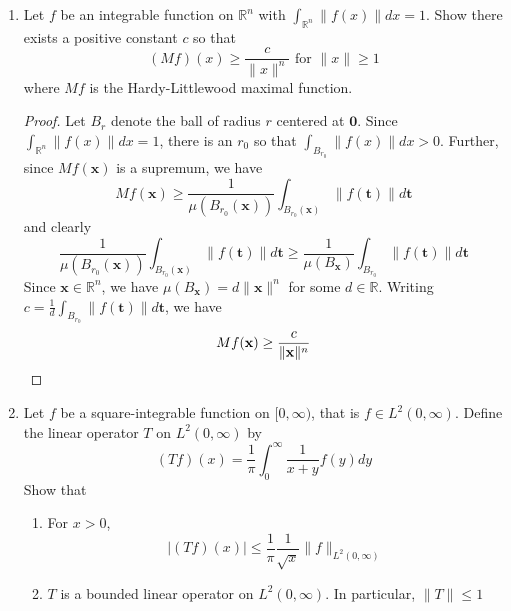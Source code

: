 \documentclass[12pt,leqno]{article}
\numberwithin{equation}{section}
\theoremstyle{definition}
\begin{document}
\begin{enumerate}
\begin{proof}
 Recall that \[\cos^2(\theta)=\frac{1+\cos2\theta}{2}\] and so \begin{align*}\int_E\cos^2(nx+u_n)dx&=\frac{1}{2}\int_E1dx+\frac{1}{2}\int_E\cos2\left(nx+u_n\right)dx\\&=\frac{1}{2}\mu(E)+\frac{1}{2}\cos2u_n\int_E\cos2nxdx-\frac{1}{2}\sin2u_n\int_E\sin2nxdx\end{align*} By the \textbf{Riemann-Lebesgue Lemma}, \begin{align*}\int_E\cos2nxdx&=\int_{-\infty}^{\infty}\chi_E(x)\cos2nxdx\to0\text{ as }n\to\infty\\\int_E\sin2nxdx&=\int_{-\infty}^{\infty}\chi_E(x)\sin2nxdx\to0\text{ as }n\to\infty\end{align*} hence \[\int_E\cos^2(nx+u_n)dx\to\frac{1}{2}m(E)\text{ as }n\to\infty\qedhere\]
\end{proof}


\item Let $f$ be an integrable function on $\mathbb{R}^n$ with $\int_{\mathbb{R}^n}\|f(x)\|dx=1$. Show there exists a positive constant $c$ so that \[(Mf)(x)\geq\frac{c}{\|x\|^n}\text{ for }\|x\|\geq1\] where $Mf$ is the Hardy-Littlewood maximal function.

\begin{proof}
Let $B_r$ denote the ball of radius $r$ centered at $\mathbf{0}$. Since $\int_{\mathbb{R}^n}\|f(x)\|dx=1$, there is an $r_0$ so that $\int_{B_{r_0}}\|f(x)\|dx>0$. Further, since $Mf(\mathbf{x})$ is a supremum, we have \[Mf(\mathbf{x})\geq\frac{1}{\mu(B_{r_0}(\mathbf{x}))}\int_{B_{r_0}(\mathbf{x})}\|f(\mathbf{t})\|d\mathbf{t}\] and clearly \[\frac{1}{\mu(B_{r_0}(\mathbf{x}))}\int_{B_{r_0}(\mathbf{x})}\|f(\mathbf{t})\|d\mathbf{t}\geq\frac{1}{\mu(B_\mathbf{x})}\int_{B_{r_0}}\|f(\mathbf{t})\|d\mathbf{t}\] Since $\mathbf{x}\in\mathbb{R}^n$, we have $\mu(B_\mathbf{x})=d\|\mathbf{x}\|^n$ for some $d\in\mathbb{R}$. Writing $c=\frac{1}{d}\int_{B_{r_0}}\|f(\mathbf{t})\|d\mathbf{t}$, we have \[Mf(\mathbf{x})\geq\frac{c}{\|\mathbf{x}\|^n}\qedhere\]
\end{proof}

\item Let $f$ be a square-integrable function on $[0,\infty)$, that is $f\in L^2(0,\infty)$. Define the linear operator $T$ on  $L^2(0,\infty)$ by \[(Tf)(x)=\frac{1}{\pi}\int_0^{\infty}\frac{1}{x+y}f(y)dy\] Show that
\begin{enumerate}
 \item For $x>0$, \[|(Tf)(x)|\leq\frac{1}{\pi}\frac{1}{\sqrt{x}}\|f\|_{L^2(0,\infty)}\]
 \item $T$ is a bounded linear operator on $L^2(0,\infty)$. In particular, $\|T\|\leq1$
\end{enumerate}


\end{enumerate}
\end{document}
